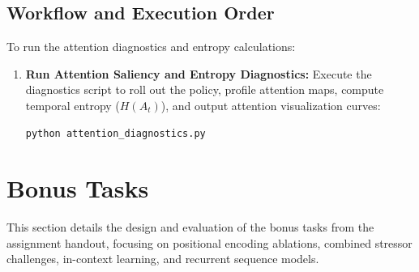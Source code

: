 \documentclass[11pt,a4paper]{article}
\begin{document}
\subsection{Workflow and Execution Order}
To run the attention diagnostics and entropy calculations:
\begin{enumerate}
    \item \textbf{Run Attention Saliency and Entropy Diagnostics:} Execute the diagnostics script to roll out the policy, profile attention maps, compute temporal entropy ($H(A_t)$), and output attention visualization curves:
    \begin{lstlisting}[language=bash]
    python attention_diagnostics.py
    \end{lstlisting}
\end{enumerate}

\FloatBarrier
\newpage

\section{Bonus Tasks}
This section details the design and evaluation of the bonus tasks from the assignment handout, focusing on positional encoding ablations, combined stressor challenges, in-context learning, and recurrent sequence models.
\end{document}
